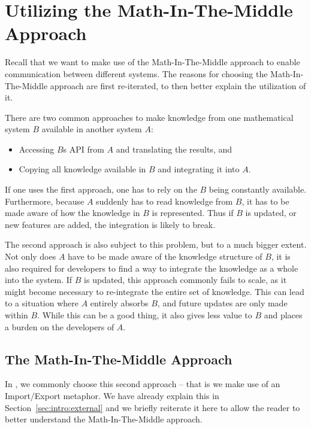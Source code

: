 \section{Utilizing the Math-In-The-Middle Approach}\label{sec:mitm}

Recall that we want to make use of the Math-In-The-Middle approach to enable communication between different systems. 
The reasons for choosing the Math-In-The-Middle approach are first re-iterated, to then better explain the utilization of it. 

There are two common approaches to make knowledge from one mathematical system $B$ available in another system $A$:
\begin{itemize}
  \item Accessing $B$s API from $A$ and translating the results, and
  \item Copying all knowledge available in $B$ and integrating it into $A$. 
\end{itemize}

If one uses the first approach, one has to rely on the $B$ being constantly available. 
Furthermore, because $A$ suddenly has to read knowledge from $B$, it has to be made aware of how the knowledge in $B$ is represented. 
Thus if $B$ is updated, or new features are added, the integration is likely to break. 

The second approach is also subject to this problem, but to a much bigger extent. 
Not only does $A$ have to be made aware of the knowledge structure of $B$, it is also required for developers to find a way to integrate the knowledge as a whole into the system. 
If $B$ is updated, this approach commonly fails to scale, as it might become necessary to re-integrate the entire set of knowledge. 
This can lead to a situation where $A$ entirely absorbs $B$, and future updates are only made within $B$. 
While this can be a good thing, it also gives less value to $B$ and places a burden on the developers of $A$. 

\subsection{The Math-In-The-Middle Approach}\label{sec:mitm:mitm}

In \mmt, we commonly choose this second approach -- that is we make use of an Import/Export metaphor. 
We have already explain this in Section~\ref{sec:intro:external} and we briefly reiterate it here to allow the reader to better understand the Math-In-The-Middle approach. 

